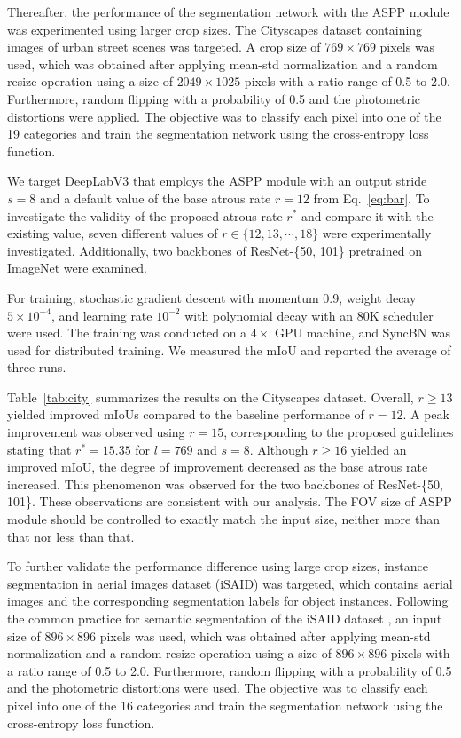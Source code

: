 \documentclass{article}
\def\tabref#1{Table~\ref{#1}}
\def\eqref#1{Eq.~\ref{#1}}
\begin{document}
Thereafter, the performance of the segmentation network with the ASPP module was experimented using larger crop sizes. The Cityscapes dataset \citep{DBLP:conf/cvpr/CordtsORREBFRS16} containing images of urban street scenes was targeted. A crop size of $769 \times 769$ pixels was used, which was obtained after applying mean-std normalization and a random resize operation using a size of $2049 \times 1025$ pixels with a ratio range of 0.5 to 2.0. Furthermore, random flipping with a probability of 0.5 and the photometric distortions were applied. The objective was to classify each pixel into one of the 19 categories and train the segmentation network using the cross-entropy loss function.

We target DeepLabV3 that employs the ASPP module with an output stride $s=8$ and a default value of the base atrous rate $r=12$ from \eqref{eq:bar}. To investigate the validity of the proposed atrous rate $r^*$ and compare it with the existing value, seven different values of $r \in \{12, 13, \cdots, 18\}$ were experimentally investigated. Additionally, two backbones of ResNet-\{50, 101\} pretrained on ImageNet \citep{DBLP:conf/cvpr/DengDSLL009} were examined.

For training, stochastic gradient descent with momentum 0.9, weight decay $5 \times 10^{-4}$, and learning rate $10^{-2}$ with polynomial decay with an 80K scheduler were used. The training was conducted on a $4 \times$ GPU machine, and SyncBN \citep{DBLP:conf/cvpr/0005DSZWTA18} was used for distributed training. We measured the mIoU and reported the average of three runs.

\tabref{tab:city} summarizes the results on the Cityscapes dataset. Overall, $r \geq 13$ yielded improved mIoUs compared to the baseline performance of $r=12$. A peak improvement was observed using $r=15$, corresponding to the proposed guidelines stating that $r^*=15.35$ for $l=769$ and $s=8$. Although $r \geq 16$ yielded an improved mIoU, the degree of improvement decreased as the base atrous rate increased. This phenomenon was observed for the two backbones of ResNet-\{50, 101\}. These observations are consistent with our analysis. The FOV size of ASPP module should be controlled to exactly match the input size, neither more than that nor less than that.

To further validate the performance difference using large crop sizes, instance segmentation in aerial images dataset (iSAID) \citep{DBLP:conf/cvpr/ZamirAGKSK00XB19,DBLP:conf/cvpr/XiaBDZBLDPZ18} was targeted, which contains aerial images and the corresponding segmentation labels for object instances. Following the common practice for semantic segmentation of the iSAID dataset \citep{DBLP:conf/nips/GuoLHLC022}, an input size of $896 \times 896$ pixels was used, which was obtained after applying mean-std normalization and a random resize operation using a size of $896 \times 896$ pixels with a ratio range of 0.5 to 2.0. Furthermore, random flipping with a probability of 0.5 and the photometric distortions were used. The objective was to classify each pixel into one of the 16 categories and train the segmentation network using the cross-entropy loss function.
\end{document}
